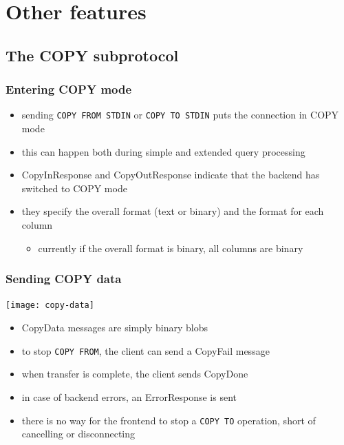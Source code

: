 \documentclass{beamer}
\begin{document}
\section{Other features}
\subsection{The COPY subprotocol}

\begin{frame}
  \frametitle{Entering COPY mode}

  \begin{itemize}
  \item sending \texttt{COPY FROM STDIN} or \texttt{COPY TO STDIN} puts the
    connection in COPY mode
  \item this can happen both during simple and extended query processing
  \item CopyInResponse and CopyOutResponse indicate that the backend has
    switched to COPY mode
  \item they specify the overall format (text or binary) and the format for
    each column
    \begin{itemize}
    \item currently if the overall format is binary, all columns are binary
    \end{itemize}
  \end{itemize}
\end{frame}

\begin{frame}
  \frametitle{Sending COPY data}

  \begin{center}
    \texttt{[image: copy-data]}
  \end{center}

  \begin{itemize}
  \item CopyData messages are simply \alert{binary blobs}
  \item to stop \texttt{COPY FROM}, the client can send a CopyFail message
  \item when transfer is complete, the client sends CopyDone
  \item in case of backend errors, an ErrorResponse is sent
  \item there is no way for the frontend to stop a \texttt{COPY TO} operation,
    short of cancelling or disconnecting
  \end{itemize}
\end{frame}
\end{document}
